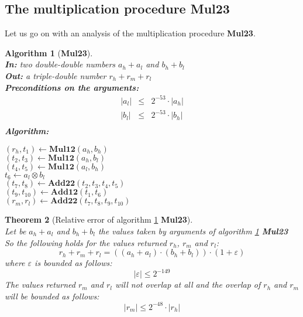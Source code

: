 \documentclass[a4paper,10pt,twoside]{article}
\newtheorem{theorem}{Theorem}[section]
\newtheorem{algorithm}[theorem]{Algorithm}
\newcommand{\hi}{\ensuremath{\mathit{h}}}
\newcommand{\mi}{\ensuremath{\mathit{m}}}
\newcommand{\lo}{\ensuremath{\mathit{l}}}
\newcommand{\MulDT}{{\bf Mul23}}
\newcommand{\mAdd}{\ensuremath{\mathbf{Add12}}}
\newcommand{\mAddDD}{\ensuremath{\mathbf{Add22}}}
\newcommand{\mMul}{\ensuremath{\mathbf{Mul12}}}
\renewcommand{\epsilon}{\varepsilon}
\begin{document}
\subsection{The multiplication procedure \MulDT}
Let us go on with an analysis of the multiplication procedure \MulDT. 
\begin{algorithm}[\MulDT] \label{mulDTref} ~ \\
{\bf In:} two double-double numbers $a_\hi + a_\lo$ and $b_\hi + b_\lo$ \\
{\bf Out:} a triple-double number $r_\hi + r_\mi + r_\lo$ \\
{\bf Preconditions on the arguments:}
\begin{eqnarray*}
\left \vert a_\lo \right \vert & \leq & 2^{-53} \cdot \left \vert a_\hi \right \vert \\
\left \vert b_\lo \right \vert & \leq & 2^{-53} \cdot \left \vert b_\hi \right \vert \\
\end{eqnarray*}
{\bf Algorithm:} \\
\begin{center}
\begin{minipage}[b]{50mm}
$\left( r_\hi, t_1 \right) \gets \mMul\left( a_\hi, b_\hi \right)$ \\
$\left( t_2, t_3 \right) \gets \mMul\left( a_\hi, b_\lo \right)$ \\
$\left( t_4, t_5 \right) \gets \mMul\left( a_\lo, b_\hi \right)$ \\
$t_6 \gets a_\lo \otimes b_\lo$ \\
$\left( t_7, t_8 \right) \gets \mAddDD\left( t_2, t_3, t_4, t_5 \right)$ \\
$\left( t_9, t_{10} \right) \gets \mAdd\left( t_1, t_6 \right)$ \\
$\left( r_\mi, r_\lo \right) \gets \mAddDD\left( t_7, t_8, t_9, t_{10} \right)$ \\
\end{minipage}
\end{center}
\end{algorithm}
\begin{theorem}[Relative error of algorithm \ref{mulDTref} \MulDT] ~ \\
Let be $a_\hi + a_\lo$ and $b_\hi + b_\lo$ the values taken by arguments of algorithm \ref{mulDTref} \MulDT \\
So the following holds for the values returned $r_\hi$, $r_\mi$ and $r_\lo$:
$$r_\hi + r_\mi + r_\lo = \left(\left(a_\hi + a_\lo \right) \cdot \left( b_\hi + b_\lo \right)\right) \cdot \left(1 + \epsilon\right)$$
where $\epsilon$ is bounded as follows:
$$\left \vert \epsilon \right \vert \leq 2^{-149}$$
The values returned $r_\mi$ and $r_\lo$ will not overlap at all and the overlap of $r_\hi$ and $r_\mi$ will be bounded as
follows:
$$\left \vert r_\mi \right \vert \leq 2^{-48} \cdot \left \vert r_\hi \right \vert$$
\end{theorem}
\end{document}
